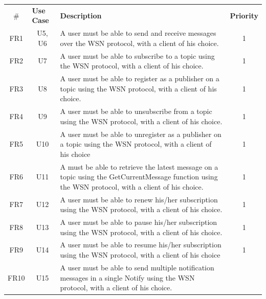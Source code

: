 \begin{longtable}{@{\extracolsep{\fill}}|l|l|p{8cm}|l|@{}}
\hline
\rowcolor{lightgray}
\multicolumn{4}{|c|}{\textbf{Functional requirements}}  \\ \hline
\multicolumn{1}{|c|}{\textbf{$\#$}} & \textbf{Use Case} & \textbf{Description}    & \textbf{Priority} \\ \hline
\multicolumn{1}{|c|}{FR1} & \multicolumn{1}{c|}{U5, U6} & A user must be able to send and receive messages over the WSN protocol, with a client of his choice. & 
\multicolumn{1}{c|}{1} \\ \hline
\multicolumn{1}{|c|}{FR2} & \multicolumn{1}{c|}{U7} & A user must be able to subscribe to a topic using the WSN protocol, with a client of his choice. &
\multicolumn{1}{c|}{1} \\ \hline
\multicolumn{1}{|c|}{FR3} & \multicolumn{1}{c|}{U8} & A user must be able to register as a publisher on a topic using the WSN protocol, with a client of his choice. &
\multicolumn{1}{c|}{1} \\ \hline
\multicolumn{1}{|c|}{FR4} & \multicolumn{1}{c|}{U9} & A user must be able to unsubscribe from a topic using the WSN protocol, with a client of his choice. &
\multicolumn{1}{c|}{1} \\ \hline
\multicolumn{1}{|c|}{FR5} & \multicolumn{1}{c|}{U10} & A user must be able to unregister as a publisher on a topic using the WSN protocol, with a client of his choice &
\multicolumn{1}{c|}{1} \\ \hline
\multicolumn{1}{|c|}{FR6} & \multicolumn{1}{c|}{U11} & A must be able to retrieve the latest message on a topic using the GetCurrentMessage function using the WSN protocol, with a client of his choice. &
\multicolumn{1}{c|}{1} \\ \hline
\multicolumn{1}{|c|}{FR7} & \multicolumn{1}{c|}{U12} & A user must be able to renew his/her subscription using the WSN protocol, with a client of his choice. &
\multicolumn{1}{c|}{1} \\ \hline
\multicolumn{1}{|c|}{FR8} & \multicolumn{1}{c|}{U13} & A user must be able to pause his/her subscription using the WSN protocol, with a client of his choice. &
\multicolumn{1}{c|}{1} \\ \hline
\multicolumn{1}{|c|}{FR9} & \multicolumn{1}{c|}{U14} & A user must be able to resume his/her subscription using the WSN protocol, with a client of his choice &
\multicolumn{1}{c|}{1} \\ \hline
\multicolumn{1}{|c|}{FR10} & \multicolumn{1}{c|}{U15} & A user must be able to send multiple notification messages in a single Notify using the WSN protocol, with a client of his choice. &

\end{longtable}
